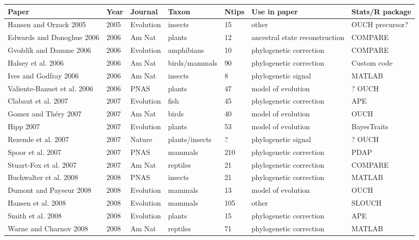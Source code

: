 \begin{landscape}
\begin{center}
\begin{longtable}{p{6cm}llllll}
\textbf{Paper}  &   Year    &   Journal &   Taxon   &   Ntips   &   Use in paper    &   Stats/R package \\
\hline
Hansen and Orzack 2005    &   2005    &   Evolution   &   insects &   15  &   other   &   OUCH precursor? \\
Edwards and Donoghue 2006     &   2006    &   Am Nat  &   plants  &   12  &   ancestral state reconstruction  &   COMPARE \\
Gvoždík and Damme 2006    &   2006    &   Evolution   &   amphibians  &   10  &   phylogenetic correction &   COMPARE \\
Halsey et al. 2006    &   2006    &   Am Nat  &   birds/mammals   &   90  &   phylogenetic correction &   Custom code \\
Ives and Godfray 2006 &   2006    &   Am Nat  &   insects &   8   &   phylogenetic signal &   MATLAB  \\
Valiente-Banuet et al. 2006   &   2006    &   PNAS    &   plants  &   47  &   model of evolution  &   ? OUCH    \\
Clabaut et al. 2007   &   2007    &   Evolution   &   fish    &   45  &   phylogenetic correction &   APE \\
Gomez and Théry 2007  &   2007    &   Am Nat  &   birds   &   40  &   model of evolution  &   OUCH    \\
Hipp 2007 &   2007    &   Evolution   &   plants  &   53  &   model of evolution  &   BayesTraits \\
Rezende et al. 2007   &   2007    &   Nature  &   plants/insects  &   ?   &   phylogenetic signal &   ? OUCH    \\
Spoor et al. 2007 &   2007    &   PNAS    &   mammals &   210 &   phylogenetic correction &   PDAP    \\
Stuart‐Fox et al. 2007    &   2007    &   Am Nat  &   reptiles    &   21  &   phylogenetic correction &   COMPARE \\
Buchwalter et al. 2008    &   2008    &   PNAS    &   insects &   21  &   phylogenetic correction &   MATLAB  \\
Dumont and Payseur 2008   &   2008    &   Evolution   &   mammals &   13  &   model of evolution  &   OUCH    \\
Hansen et al. 2008    &   2008    &   Evolution   &   mammals &   105 &   other   &   SLOUCH  \\
Smith et al. 2008 &   2008    &   Evolution   &   plants  &   15  &   phylogenetic correction &   APE \\
Warne and Charnov 2008    &   2008    &   Am Nat  &   reptiles    &   71  &   phylogenetic correction &   MATLAB  \\

\end{longtable}
\end{center}
\end{landscape}
